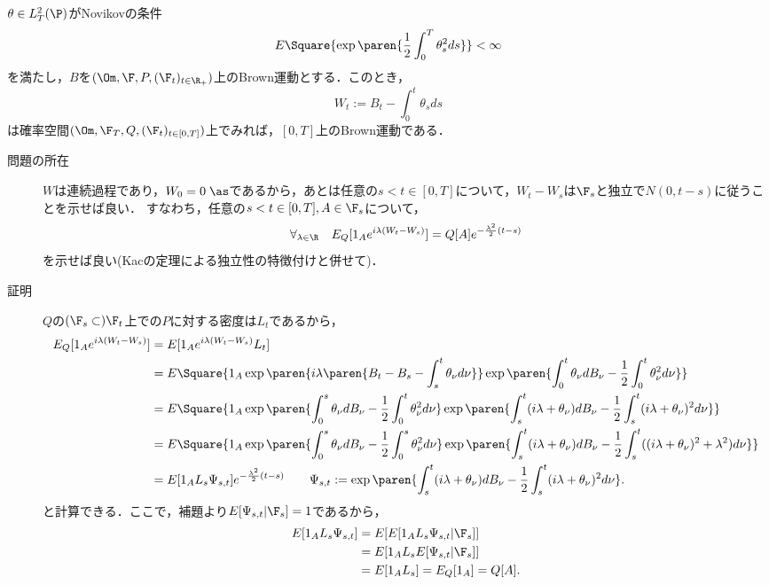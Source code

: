 \documentclass[uplatex,dvipdfmx]{jsreport}
\begin{document}
\begin{theorem}[Girsanov (1960)]\label{thm-Girsanov}
    $\theta\in L^2_T(\P)$がNovikovの条件
    \[E\Square{\exp\paren{\frac{1}{2}\int^T_0\theta^2_sds}}<\infty\]
    を満たし，$B$を$(\Om,\F,P,(\F_t)_{t\in\R_+})$上のBrown運動とする．このとき，
    \[W_t:=B_t-\int^t_0\theta_sds\]
    は確率空間$(\Om,\F_T,Q,(\F_t)_{t\in[0,T]})$上でみれば，$[0,T]$上のBrown運動である．
\end{theorem}
\begin{Proof}\mbox{}
    \begin{description}
        \item[問題の所在] $W$は連続過程であり，$W_0=0\;\as$であるから，あとは任意の$s<t\in[0,T]$について，$W_t-W_s$は$\F_s$と独立で$N(0,t-s)$に従うことを示せば良い．
        すなわち，任意の$s<t\in[0,T],A\in\F_s$について，
        \[\forall_{\lambda\in\R}\quad E_Q[1_Ae^{i\lambda(W_t-W_s)}]=Q[A]e^{-\frac{\lambda^2}{2}(t-s)}\]
        を示せば良い(Kacの定理による独立性の特徴付けと併せて)．
        \item[証明] $Q$の$(\F_s\subset)\F_t$上での$P$に対する密度は$L_t$であるから，
        \begin{align*}
            E_Q[1_Ae^{i\lambda(W_t-W_s)}]&=E[1_Ae^{i\lambda(W_t-W_s)}L_t]\\
            &=E\Square{1_A\exp\paren{i\lambda\paren{B_t-B_s-\int^t_s\theta_\nu d\nu}}\exp\paren{\int^t_0\theta_\nu dB_\nu-\frac{1}{2}\int^t_0\theta^2_\nu d\nu}}\\
            &=E\Square{1_A\exp\paren{\int^s_0\theta_\nu dB_\nu-\frac{1}{2}\int^t_0\theta^2_\nu d\nu}\exp\paren{\int^t_s(i\lambda+\theta_\nu)dB_\nu-\frac{1}{2}\int^t_s(i\lambda+\theta_\nu)^2d\nu}}\\
            &=E\Square{1_A\exp\paren{\int^s_0\theta_\nu dB_\nu-\frac{1}{2}\int^s_0\theta^2_\nu d\nu}\exp\paren{\int^t_s(i\lambda+\theta_\nu)dB_\nu-\frac{1}{2}\int^t_s((i\lambda+\theta_\nu)^2+\lambda^2)d\nu}}\\
            &=E[1_AL_s\Psi_{s,t}]e^{-\frac{\lambda^2}{2}(t-s)}\qquad \Psi_{s,t}:=\exp\paren{\int^t_s(i\lambda+\theta_\nu)dB_\nu-\frac{1}{2}\int^t_s(i\lambda+\theta_\nu)^2d\nu}.
        \end{align*}
        と計算できる．ここで，補題より$E[\Psi_{s,t}|\F_s]=1$であるから，
        \begin{align*}
            E[1_AL_s\Psi_{s,t}]&=E[E[1_AL_s\Psi_{s,t}|\F_s]]\\
            &=E[1_AL_sE[\Psi_{s,t}|\F_s]]\\
            &=E[1_AL_s]=E_Q[1_A]=Q[A].
        \end{align*}
    \end{description}
\end{Proof}
\end{document}
